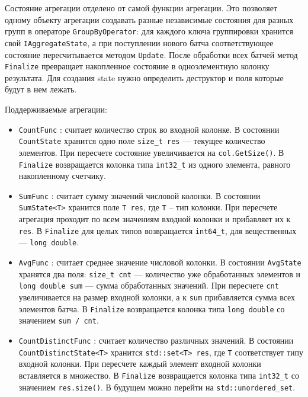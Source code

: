 \documentclass[a4paper,12pt]{extarticle}
\begin{document}
Состояние агрегации отделено от самой функции агрегации. Это позволяет одному объекту
агрегации создавать разные независимые состояния для разных групп в операторе
\texttt{GroupByOperator}: для каждого ключа группировки хранится свой
\texttt{IAggregateState}, а при поступлении нового батча соответствующее состояние
пересчитывается методом \texttt{Update}. После обработки всех батчей метод
\texttt{Finalize} превращает накопленное состояние в одноэлементную колонку результата.
Для создания state нужно определить деструктор и поля которые будут в нем лежать.

Поддерживаемые агрегации:

\begin{itemize}
    \item \texttt{CountFunc} : считает количество строк во входной колонке. В состоянии
    \texttt{CountState} хранится одно поле \texttt{size\_t res} --- текущее количество
    элементов. При пересчете состояние увеличивается на \texttt{col.GetSize()}.
    В \texttt{Finalize} возвращается колонка типа \texttt{int32\_t} из одного элемента,
    равного накопленному счетчику.

    \item \texttt{SumFunc} : считает сумму значений числовой колонки. В состоянии
    \texttt{SumState<T>} хранится поле \texttt{T res}, где \texttt{T} -- тип
    колонки. При пересчете
    агрегация проходит по всем значениям входной колонки и прибавляет их к
    \texttt{res}. В \texttt{Finalize} для целых типов возвращается
    \texttt{int64\_t}, для вещественных --- \texttt{long double}.

    \item \texttt{AvgFunc} : считает среднее значение числовой колонки. В состоянии
    \texttt{AvgState} хранятся два поля: \texttt{size\_t cnt} --- количество уже
    обработанных элементов и \texttt{long double sum} --- сумма обработанных значений.
    При пересчете \texttt{cnt} увеличивается на размер входной колонки, а к
    \texttt{sum} прибавляется сумма всех элементов батча. В \texttt{Finalize}
    возвращается колонка типа \texttt{long double} со значением
    \texttt{sum / cnt}.

    \item \texttt{CountDistinctFunc} : считает количество различных значений. В состоянии
    \texttt{CountDistinctState<T>} хранится \texttt{std::set<T> res}, где \texttt{T}
    соответствует типу входной колонки. При пересчете каждый элемент входной колонки
    вставляется в множество. В \texttt{Finalize} возвращается колонка типа
    \texttt{int32\_t} со значением \texttt{res.size()}. В будущем можно перейти
    на \texttt{std::unordered\_set}.


\end{itemize}
\end{document}
